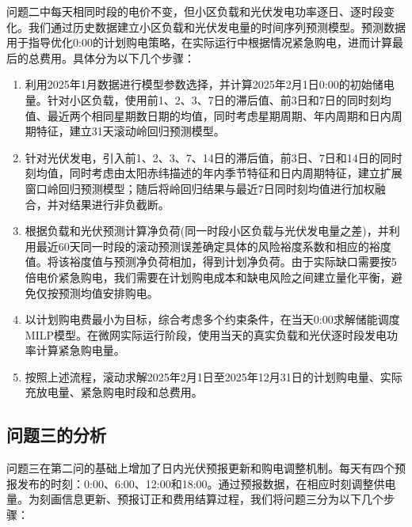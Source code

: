 \documentclass[UTF8]{ctexart}
\begin{document}
    问题二中每天相同时段的电价不变，但小区负载和光伏发电功率逐日、逐时段变化。我们通过历史数据建立小区负载和光伏发电量的时间序列预测模型。预测数据用于指导优化0:00的计划购电策略，在实际运行中根据情况紧急购电，进而计算最后的总费用。具体分为以下几个步骤：
    
    \begin{enumerate}[label=(\arabic*),leftmargin=2.8em]
        \item 利用2025年1月数据进行模型参数选择，并计算2025年2月1日0:00的初始储电量。针对小区负载，使用前1、2、3、7日的滞后值、前3日和7日的同时刻均值、最近两个相同星期数日期的均值，同时考虑星期周期、年内周期和日内周期特征，建立31天滚动岭回归预测模型。
        
        \item 针对光伏发电，引入前1、2、3、7、14日的滞后值，前3日、7日和14日的同时刻均值，同时考虑由太阳赤纬描述的年内季节特征和日内周期特征，建立扩展窗口岭回归预测模型；随后将岭回归结果与最近7日同时刻均值进行加权融合，并对结果进行非负截断。
        
        \item 根据负载和光伏预测计算净负荷(同一时段小区负载与光伏发电量之差)，并利用最近60天同一时段的滚动预测误差确定具体的风险裕度系数和相应的裕度值。将该裕度值与预测净负荷相加，得到计划净负荷。由于实际缺口需要按5倍电价紧急购电，我们需要在计划购电成本和缺电风险之间建立量化平衡，避免仅按预测均值安排购电。
        
        \item 以计划购电费最小为目标，综合考虑多个约束条件，在当天0:00求解储能调度MILP模型。在微网实际运行阶段，使用当天的真实负载和光伏逐时段发电功率计算紧急购电量。
        
        \item 按照上述流程，滚动求解2025年2月1日至2025年12月31日的计划购电量、实际充放电量、紧急购电时段和总费用。
    \end{enumerate}
    
    \subsection{问题三的分析}
    
    问题三在第二问的基础上增加了日内光伏预报更新和购电调整机制。每天有四个预报发布的时刻：0:00、6:00、12:00和18:00。通过预报数据，在相应时刻调整供电量。为刻画信息更新、预报订正和费用结算过程，我们将问题三分为以下几个步骤：
    
\end{document}
